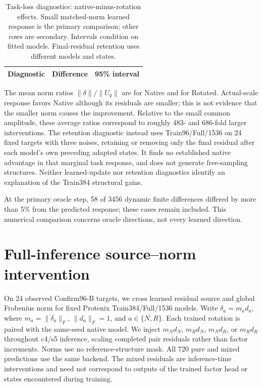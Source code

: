 \begin{table}[h]
\caption{Task-loss diagnostics: native-minus-rotation effects. Small
matched-norm learned response is the primary comparison; other rows are secondary.
Intervals condition on fitted models. Final-residual retention uses different models and states.}
\label{tab:v4}\centering\footnotesize
\begin{tabular}{lrr}\toprule
Diagnostic & Difference & 95\% interval \\\midrule

\end{tabular}
\end{table}

The mean norm ratios $\|\delta\|/\|U_q\|$ are
 for Native and
 for Rotated. Actual-scale response favors Native
although its residuals are smaller; this is not evidence that the smaller norm
causes the improvement. Relative to the small common amplitude, these average
ratios correspond to roughly 483- and 686-fold larger interventions. The retention diagnostic instead
uses Train96/Full/1536 on 24 fixed targets with three noises, retaining or removing
only the final residual after each model's own preceding adapted states.
It finds no established native advantage in that marginal task response, and
does not generate free-sampling structures. Neither learned-update nor retention diagnostics identify an
explanation of the Train384 structural gains.

At the primary oracle step, 58 of 3456 dynamic finite differences differed by
more than 5\% from the predicted response; these cases remain included. This
numerical comparison concerns oracle directions, not every learned direction.

\section{Full-inference source--norm intervention}
\label{app:norm_cross}
On 24 observed Confirm96-B targets, we cross learned residual source and global
Frobenius norm for fixed Protenix Train384/Full/1536 models. Write
$\delta_a=m_ad_a$, where $m_a=\|\delta_a\|_F$, $\|d_a\|_F=1$, and
$a\in\{N,R\}$. Each trained rotation is paired with the same-seed native model.
We inject $m_Nd_N$, $m_Rd_N$, $m_Nd_R$, or $m_Rd_R$ throughout c4/s5 inference,
scaling completed pair residuals rather than factor increments. Norms use no
reference-structure mask. All 720 pure and mixed predictions use the same
backend. The mixed residuals are inference-time interventions and need not
correspond to outputs of the trained factor head or states encountered
during training.

